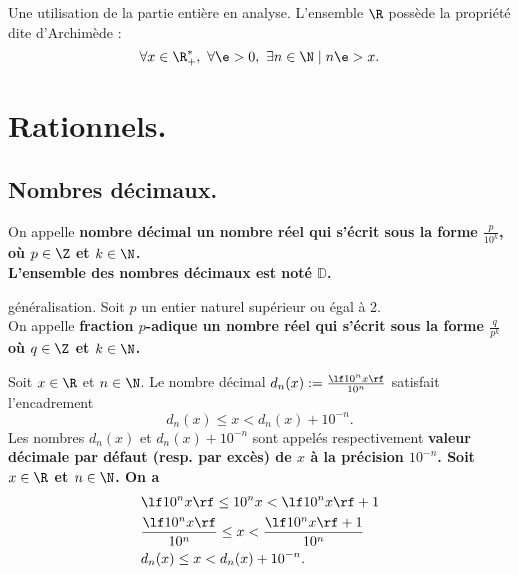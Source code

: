 \documentclass[11pt]{article}
\renewcommand*{\D}{\mathbb{D}}
\begin{document}
\begin{lemme}{Une utilisation de la partie entière en analyse.}{}
    L'ensemble $\R$ possède la propriété dite d'Archimède :
    \begin{equation*}
        \forall x \in \R_+^*,~\forall \e>0,~\exists n\in\N \mid n\e>x.
    \end{equation*}
\end{lemme}

\section{Rationnels.}

\subsection{Nombres décimaux.}

\begin{defi}{}{}
    On appelle \bf{nombre décimal} un nombre réel qui s'écrit sous la forme $\frac{p}{10^k}$, où $p\in\Z$ et $k\in\N$.\\
    L'ensemble des nombres décimaux est noté $\D$.
\end{defi}

\begin{defi}{généralisation.}{}
    Soit $p$ un entier naturel supérieur ou égal à 2.\\
    On appelle \bf{fraction $p$-adique} un nombre réel qui s'écrit sous la forme $\frac{q}{p^k}$ où $q\in\Z$ et $k\in\N$.
\end{defi}

\begin{prop}{}{}
    Soit $x\in\R$ et $n\in\N$. Le nombre décimal $d_n(x):=\frac{\lf 10^nx\rf}{10^n}$ satisfait l'encadrement
    \begin{equation*}
        d_n(x) \leq x<d_n(x)+10^{-n}.
    \end{equation*}
    Les nombres $d_n(x)$ et $d_n(x)+10^{-n}$ sont appelés respectivement \bf{valeur décimale} par défaut (resp. par excès) de $x$ à la précision $10^{-n}$.
    \tcblower
    Soit $x\in\R$ et $n\in\N$. On a
    \begin{align*}
        &\lf 10^nx \rf \leq 10^nx<\lf 10^nx\rf + 1\\
        &\frac{\lf 10^n x \rf}{10^n} \leq x < \frac{\lf 10^n x\rf + 1}{10^n}\\
        &d_n(x)\leq x < d_n(x)+10^{-n}.
    \end{align*}
\end{prop}
\end{document}
